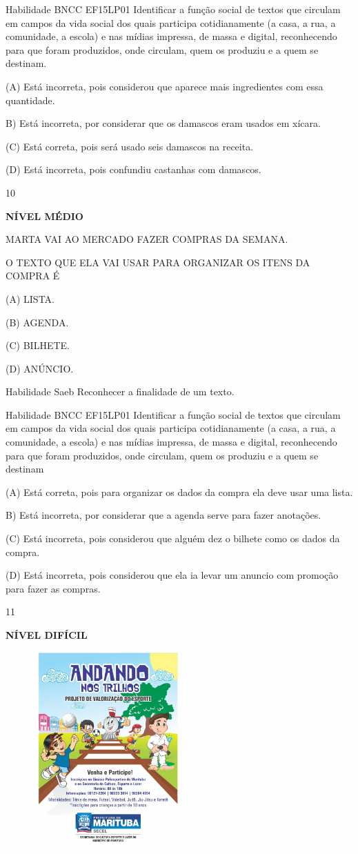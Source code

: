{{Habilidade BNCC EF15LP01 Identificar a função social de textos que
circulam em campos da vida social dos quais participa cotidianamente (a
casa, a rua, a comunidade, a escola) e nas mídias impressa, de massa e
digital, reconhecendo para que foram produzidos, onde circulam, quem os
produziu e a quem se destinam.

(A) Está incorreta, pois considerou que aparece mais ingredientes com
essa quantidade.

B) Está incorreta, por considerar que os damascos eram usados em xícara.

(C) Está correta, pois será usado seis damascos na receita.

(D) Está incorreta, pois confundiu castanhas com damascos.

\num{10}

\textbf{NÍVEL MÉDIO}

MARTA VAI AO MERCADO FAZER COMPRAS DA SEMANA.

O TEXTO QUE ELA VAI USAR PARA ORGANIZAR OS ITENS DA COMPRA É

(A) LISTA.

(B) AGENDA.

(C) BILHETE.

(D) ANÚNCIO.

Habilidade Saeb Reconhecer a finalidade de um texto.

Habilidade BNCC EF15LP01 Identificar a função social de textos que
circulam em campos da vida social dos quais participa cotidianamente (a
casa, a rua, a comunidade, a escola) e nas mídias impressa, de massa e
digital, reconhecendo para que foram produzidos, onde circulam, quem os
produziu e a quem se destinam

(A) Está correta, pois para organizar os dados da compra ela deve usar
uma lista.

B) Está incorreta, por considerar que a agenda serve para fazer
anotações.

(C) Está incorreta, pois considerou que alguém dez o bilhete como os
dados da compra.

(D) Está incorreta, pois considerou que ela ia levar um anuncio com
promoção para fazer as compras.

\num{11}

\textbf{NÍVEL DIFÍCIL}

\includegraphics[width=3.11515in,height=2.97237in]{media/image170.jpeg}

}}
